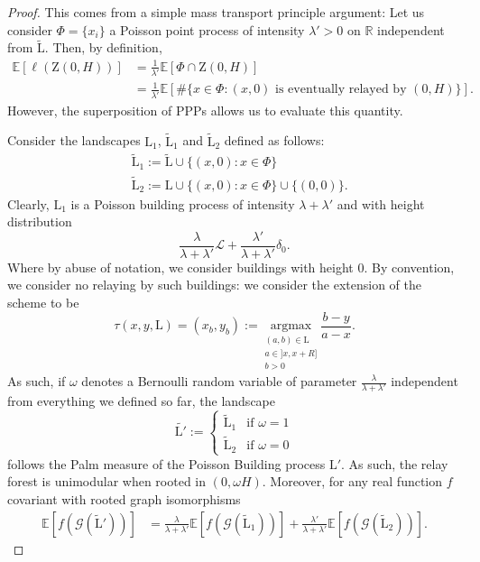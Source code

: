 \documentclass[10pt,a4paper]{amsart}
\newcommand{\R}{\mathbb{R}}
\newcommand{\e}{\mathbb{E}}
\newcommand{\landsc}{\mathrm{L}}
\newcommand{\zone}{\mathrm{Z}}
\begin{document}
\begin{proof}
This comes from a simple mass transport principle argument: Let us consider $\Phi = \{x_i\}$ a Poisson point process of intensity $\lambda'>0$ on $\R$ independent from $\tilde{\landsc}$. Then, by definition,
\begin{align*}
\e[\ell(\zone(0, H))] &= \frac{1}{\lambda'}\e[\Phi\cap \zone(0, H)]\\
&= \frac{1}{\lambda'}\e[\# \{x\in \Phi: (x, 0)\text{ is eventually relayed by } (0, H)\}].
\end{align*}
However, the superposition of PPPs allows us to evaluate this quantity.

Consider the landscapes $\landsc_1$, $\tilde{\landsc}_1$ and $\tilde{\landsc}_2$ defined as follows:
\begin{align*}
    &\tilde{\landsc}_1 := \tilde{\landsc}\cup \{(x, 0): x\in \Phi\}\\
    &\tilde{\landsc}_2 := \landsc\cup \{(x, 0): x\in \Phi\}\cup \{(0, 0)\}.
\end{align*}
Clearly, $\landsc_1$ is a Poisson building process of intensity $\lambda +\lambda'$ and with height distribution
\[\frac{\lambda}{\lambda+\lambda'}\mathcal{L}+\frac{\lambda'}{\lambda + \lambda'} \delta_0.\]
Where by abuse of notation, we consider buildings with height $0$. By convention, we consider no relaying by such buildings: we consider the extension of the scheme to be
\[\tau (x, y, \landsc) = (x_b, y_b) := \underset{\substack{(a, b) \in \landsc \\a\in ]x, x+R]\\b>0}}{\text{argmax}} \frac{b-y}{a-x}.\]
As such, if $\omega$ denotes a Bernoulli random variable of parameter $\frac{\lambda}{\lambda+\lambda'}$ independent from everything we defined so far, the landscape
$$\tilde{\landsc'}:=\left\{
    \begin{array}{ll}
        \tilde{\landsc}_1 & \mbox{if } \omega = 1 \\
        \tilde{\landsc}_2 & \mbox{if }\omega=0
    \end{array}
\right.$$
follows the Palm measure of the Poisson Building process $\landsc'$. As such, the relay forest is unimodular when rooted in $(0, \omega H)$. Moreover, for any real function $f$ covariant with rooted graph isomorphisms
\begin{align*}
    \e[f(\mathcal{G}( \tilde{\landsc}'))]  &= \frac{\lambda}{\lambda+\lambda'}\e[f(\mathcal{G}( \tilde{\landsc}_1))] + \frac{\lambda'}{\lambda+\lambda'}\e[f(\mathcal{G}( \tilde{\landsc}_2))].
\end{align*}

\end{proof}
\end{document}
